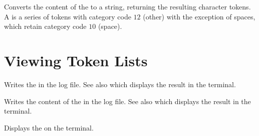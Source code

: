 \documentclass[oneside]{book}
\let\tn=\cs
\begin{document}
\begin{function}{\TlVarToStr}
\begin{syntax}
 
\end{syntax}
Converts the content of the  to a string, returning the
resulting character tokens. A 
is a series of tokens with category code $12$ (other) with the exception
of spaces, which retain category code $10$ (space).
\begin{demohigh}
\TlSet {}
\TlVarToStr \lTmpaTl
\end{demohigh}
\end{function}

\section{Viewing Token Lists}

\begin{function}{\TlLog}
\begin{syntax}
 
\end{syntax}
Writes the  in the log file. See also
 which displays the result in the terminal.
\begin{codehigh}
\end{codehigh}
\end{function}

\begin{function}{\TlVarLog}
\begin{syntax}
 
\end{syntax}
Writes the content of the  in the log file. See also
 which displays the result in the terminal.
\begin{codehigh}
\TlSet {}
\TlVarLog \lTmpaTl
\end{codehigh}
\end{function}

\begin{function}{\TlShow}
\begin{syntax}
 
\end{syntax}
Displays the  on the terminal.
\begin{codehigh}
\end{codehigh}
\end{function}
\end{document}

